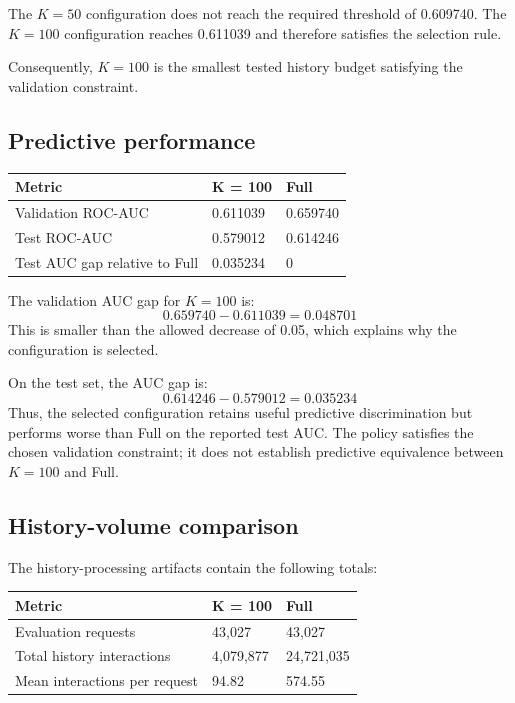 \documentclass[11pt,a4paper]{article}
\begin{document}
The $K = 50$ configuration does not reach the required threshold of 0.609740. The $K = 100$ configuration reaches 0.611039 and therefore satisfies the selection rule.

Consequently, $K = 100$ is the smallest tested history budget satisfying the validation constraint.

\subsection{Predictive performance}
\begin{table}[htbp]
\centering
\begin{tabular}{lll}
\toprule
\textbf{Metric} & \textbf{K = 100} & \textbf{Full} \\
\midrule
Validation ROC-AUC & 0.611039 & 0.659740 \\
Test ROC-AUC & 0.579012 & 0.614246 \\
Test AUC gap relative to Full & 0.035234 & 0 \\
\bottomrule
\end{tabular}
\end{table}

The validation AUC gap for $K = 100$ is:
\begin{equation}
0.659740 - 0.611039 = 0.048701
\end{equation}
This is smaller than the allowed decrease of 0.05, which explains why the configuration is selected.

On the test set, the AUC gap is:
\begin{equation}
0.614246 - 0.579012 = 0.035234
\end{equation}
Thus, the selected configuration retains useful predictive discrimination but performs worse than Full on the reported test AUC. The policy satisfies the chosen validation constraint; it does not establish predictive equivalence between $K = 100$ and Full.

\subsection{History-volume comparison}
The history-processing artifacts contain the following totals:
\begin{table}[htbp]
\centering
\begin{tabular}{lll}
\toprule
\textbf{Metric} & \textbf{K = 100} & \textbf{Full} \\
\midrule
Evaluation requests & 43,027 & 43,027 \\
Total history interactions & 4,079,877 & 24,721,035 \\
Mean interactions per request & 94.82 & 574.55 \\
\bottomrule
\end{tabular}
\end{table}
\end{document}
